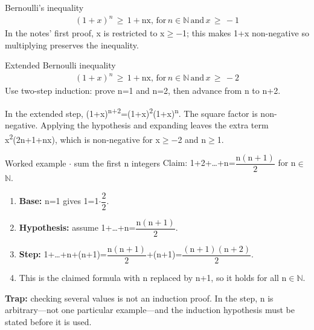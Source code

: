 \documentclass[11pt]{article}
\begin{document}
\begin{keepsection}
\begin{equationcard}{Bernoulli’s inequality}
\[ \begin{gathered} (1+{x})^{{n}}\, \geq \, 1+\text{nx},\, \text{for}\, {n}\in \mathbb{N}\, \text{and}\, {x}\, \geq \, -1 \end{gathered} \]
{\small In the notes’ first proof, x is restricted to x\ensuremath{\geq}\ensuremath{-}1; this makes 1+x non-negative so multiplying preserves the inequality.}
\end{equationcard}

\begin{equationcard}{Extended Bernoulli inequality}
\[ \begin{gathered} (1+{x})^{{n}}\, \geq \, 1+\text{nx},\, \text{for}\, {n}\in \mathbb{N}\, \text{and}\, {x}\, \geq \, -2 \end{gathered} \]
{\small Use two-step induction: prove n=1 and n=2, then advance from n to n+2.}
\end{equationcard}

In the extended step, (1+x)\textsuperscript{n+2}=(1+x)\textsuperscript{2}(1+x)\textsuperscript{n}. The square factor is non-negative. Applying the hypothesis and expanding leaves the extra term x\textsuperscript{2}(2n+1+nx), which is non-negative for x\ensuremath{\geq}\ensuremath{-}2 and n\ensuremath{\geq}1.

\begin{workedbox}{Worked example \ensuremath{\cdot} sum the first n integers}
Claim: 1+2+…+n={\small\ensuremath{\dfrac{\mathrm{n}(\mathrm{n}+1)}{2}}} for n\ensuremath{\in}\ensuremath{\mathbb{N}}.

\begin{enumerate}
\item \textbf{Base:} n=1 gives 1=1\ensuremath{\cdot}{\small\ensuremath{\dfrac{2}{2}}}.
\item \textbf{Hypothesis:} assume 1+…+n={\small\ensuremath{\dfrac{\mathrm{n}(\mathrm{n}+1)}{2}}}.
\item \textbf{Step:} 1+…+n+(n+1)={\small\ensuremath{\dfrac{\mathrm{n}(\mathrm{n}+1)}{2}}}+(n+1)={\small\ensuremath{\dfrac{(\mathrm{n}+1)(\mathrm{n}+2)}{2}}}.
\item This is the claimed formula with n replaced by n+1, so it holds for all n\ensuremath{\in}\ensuremath{\mathbb{N}}.
\end{enumerate}
\end{workedbox}

\begin{notebox}\textbf{Trap:} checking several values is not an induction proof. In the step, n is arbitrary—not one particular example—and the induction hypothesis must be stated before it is used.\end{notebox}


\end{keepsection}
\end{document}
